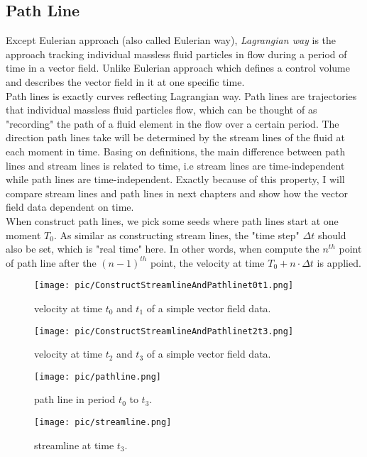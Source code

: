 \documentclass[
     11pt,         %
     a4paper,      %
     oneside,
     ]{article}
\begin{document}
	\subsection{Path Line}
	Except Eulerian approach (also called Eulerian way), \textit{Lagrangian way} is the approach tracking individual massless fluid particles in flow during a period of time in a vector field. Unlike Eulerian approach which defines a control volume and describes the vector field in it at one specific time.\\
	Path lines is exactly curves reflecting Lagrangian way. Path lines are trajectories that individual massless fluid particles flow, which can be thought of as "recording" the path of a fluid element in the flow over a certain period. The direction path lines take will be determined by the stream lines of the fluid at each moment in time\cite{PathlineDefine}. Basing on definitions, the main difference between path lines and stream lines is related to time, i.e stream lines are time-independent while path lines are time-independent. Exactly because of this property, I will compare stream lines and path lines in next chapters and show how the vector field data dependent on time.\\
	When construct path lines, we pick some seeds where path lines start at one moment $T_{0}$. As similar as constructing stream lines, the "time step" $\Delta t$ should also be set, which is "real time" here. In other words, when compute the $n^{th}$ point of path line after the $(n-1)^{th}$ point, the velocity at time $T_{0}+n\cdot\Delta t$ is applied.\\
	 \begin{figure}[H]
	 	\begin{minipage}{0.45\textwidth}
	 		\centering
	 		\texttt{[image: pic/ConstructStreamlineAndPathlinet0t1.png]}
	 		\caption{{\tiny velocity at time $t_{0}$ and $t_{1}$ of a simple vector field data.}}
	 		\label{fig:ConstructStreamlineAndPathlinet0t1}
	 	\end{minipage}
	 	\begin{minipage}{0.45\textwidth}
	         \centering
	 		 \texttt{[image: pic/ConstructStreamlineAndPathlinet2t3.png]}
	 		 \caption{{\tiny velocity at time $t_{2}$ and $t_{3}$ of a simple vector field data.}}
	 		 \label{fig:ConstructStreamlineAndPathlinet2t3}
	 	\end{minipage}
	 	\begin{minipage}{0.45\textwidth}
	 		 \centering
	 		 \texttt{[image: pic/pathline.png]}
	 		 \caption{{\tiny path line in period $t_{0}$ to $t_{3}$.}}
	 		 \label{fig:pathline}
	 	\end{minipage}
	 	\begin{minipage}{0.45\textwidth}
	    	 \centering
	 		 \texttt{[image: pic/streamline.png]}
	 		 \caption{{\tiny streamline at time $t_{3}$.}}
	 		 \label{fig:streamline}
	 \end{minipage}
	 \end{figure}
\end{document}
